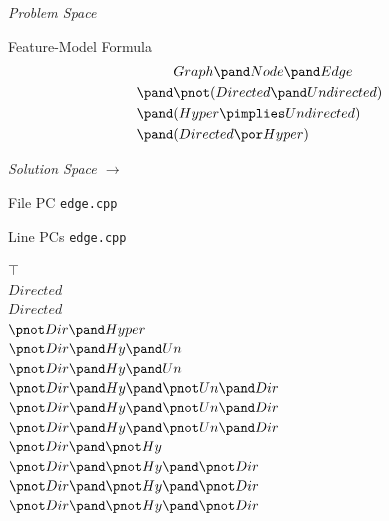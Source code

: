 \begin{frame}[t,fragile]{\myframetitle}
	\begin{fancycolumns}[t,columns=4,widths={31,20,20,29},animation=none]
		\emph{Problem Space}
		\begin{exampletight}{Feature-Model Formula}
			\vspace*{-3ex}
			\color{lecturered}
			\begin{align*}
				&Graph \pand Node \pand Edge \\
				\pand &\pnot (Directed \pand Undirected) \\
				\pand &(Hyper \pimplies Undirected)\\
				\pand &(Directed \por Hyper)
			\end{align*}
		\end{exampletight}
	\nextcolumn
		\emph{Solution Space $\rightarrow$}
		\begin{exampletight}{File PC \tiny\texttt{edge.cpp}}
			\vspace*{4.5ex}
			\Huge\centering{}
			\vspace*{4.5ex}
		\end{exampletight}
	\nextcolumn
		\begin{exampletight}{Line PCs \tiny\texttt{edge.cpp}}
			\tiny\vspace*{0.5ex}
			\begin{flushright}
				{\color{gray}$\top$}\\
				{\color{gray}$Directed$}\\
				{\color{gray}$Directed$}\\
				{\color{gray}$\pnot Dir \pand Hyper$}\\
				{\color{gray}$\pnot Dir \pand Hy \pand Un$}\\
				{\color{gray}$\pnot Dir \pand Hy \pand Un$}\\
				{\color{gray}$\pnot Dir \pand Hy \pand \pnot Un \pand Dir$}\\
				{\color{gray}$\pnot Dir \pand Hy \pand \pnot Un \pand Dir$}\\
				{\color{gray}$\pnot Dir \pand Hy \pand \pnot Un \pand Dir$}\\
				{\color{gray}$\pnot Dir \pand \pnot Hy$}\\
				{\color{gray}$\pnot Dir \pand \pnot Hy \pand \pnot Dir$}\\
				{\color{lecturered}$\pnot Dir \pand \pnot Hy \pand \pnot Dir$}\\
				{\color{gray}$\pnot Dir \pand \pnot Hy \pand \pnot Dir$}\\

\end{flushright}
\end{exampletight}
\end{fancycolumns}
\end{frame}

